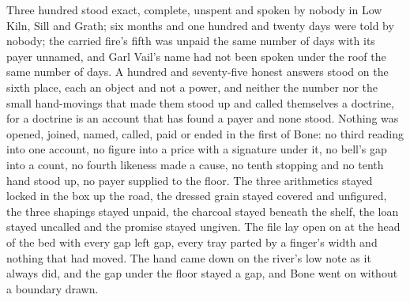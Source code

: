 Three hundred stood exact, complete, unspent and spoken by nobody in Low Kiln, Sill and Grath; six months and one hundred and twenty days were told by nobody; the carried fire's fifth was unpaid the same number of days with its payer unnamed, and Garl Vail's name had not been spoken under the roof the same number of days. A hundred and seventy-five honest answers stood on the sixth place, each an object and not a power, and neither the number nor the small hand-movings that made them stood up and called themselves a doctrine, for a doctrine is an account that has found a payer and none stood. Nothing was opened, joined, named, called, paid or ended in the first of Bone: no third reading into one account, no figure into a price with a signature under it, no bell's gap into a count, no fourth likeness made a cause, no tenth stopping and no tenth hand stood up, no payer supplied to the floor. The three arithmetics stayed locked in the box up the road, the dressed grain stayed covered and unfigured, the three shapings stayed unpaid, the charcoal stayed beneath the shelf, the loan stayed uncalled and the promise stayed ungiven. The file lay open on  at the head of the bed with every gap left gap, every tray parted by a finger's width and nothing that had moved. The hand came down on the river's low note as it always did, and the gap under the floor stayed a gap, and Bone went on without a boundary drawn.
